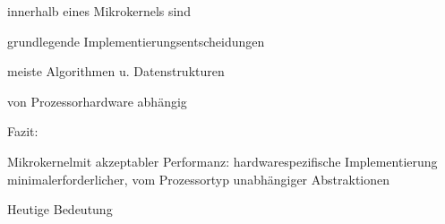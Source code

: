 \documentclass[a4paper]{article}
\begin{document}
\begin{multicols}{3}
\begin{enumerate*}
\begin{itemize*}
        \end{itemize*}
        \item
        innerhalb eines Mikrokernels sind
        \begin{enumerate*}
            \def\labelenumii{\arabic{enumii}.}
            \item grundlegende Implementierungsentscheidungen
            \item meiste Algorithmen u. Datenstrukturen
        \end{enumerate*}
        \begin{itemize*}
            \item von Prozessorhardware abhängig
        \end{itemize*}
    \end{enumerate*}

    \begin{itemize*}
        \item
        Fazit:
        \begin{itemize*}
            \item Mikrokernelmit akzeptabler Performanz: hardwarespezifische Implementierung minimalerforderlicher, vom Prozessortyp unabhängiger Abstraktionen
        \end{itemize*}
    \end{itemize*}

    Heutige Bedeutung


\end{multicols}
\end{document}
